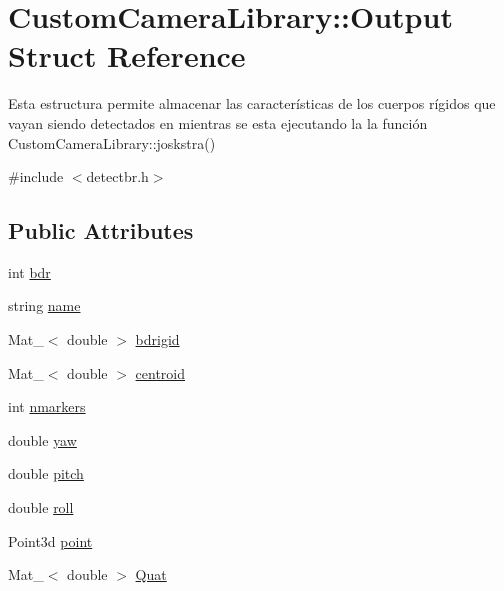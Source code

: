\hypertarget{struct_custom_camera_library_1_1_output}{}\section{Custom\+Camera\+Library\+:\+:Output Struct Reference}
\label{struct_custom_camera_library_1_1_output}


Esta estructura permite almacenar las características de los cuerpos rígidos que vayan siendo detectados en mientras se esta ejecutando la la función Custom\+Camera\+Library\+::joskstra()  




{\ttfamily \#include $<$detectbr.\+h$>$}

\subsection*{Public Attributes}
\begin{DoxyCompactItemize}
\item 
int \hyperlink{struct_custom_camera_library_1_1_output_a035a9b6775bc3cd9637f8b67018f628b}{bdr}
\item 
string \hyperlink{struct_custom_camera_library_1_1_output_af0a8276215ad6447ca0391d32ffe72f5}{name}
\item 
Mat\+\_\+$<$ double $>$ \hyperlink{struct_custom_camera_library_1_1_output_ae2017d51295ddb45390dc715b4815b29}{bdrigid}
\item 
Mat\+\_\+$<$ double $>$ \hyperlink{struct_custom_camera_library_1_1_output_a06fa54e7fbbd5075e6517b9a6c93ca97}{centroid}
\item 
int \hyperlink{struct_custom_camera_library_1_1_output_a3361db4b0b8107c1458feebbb50c0589}{nmarkers}
\item 
double \hyperlink{struct_custom_camera_library_1_1_output_a7fa444f6b387695a1b29c460fe5f1bad}{yaw}
\item 
double \hyperlink{struct_custom_camera_library_1_1_output_a2ecfe8192c7cc66e5d3385c21ef4ab39}{pitch}
\item 
double \hyperlink{struct_custom_camera_library_1_1_output_a9383b78c1f441b6c816533c0011c2478}{roll}
\item 
Point3d \hyperlink{struct_custom_camera_library_1_1_output_aa8d02d07cd889dd98ed76942616cd06c}{point}
\item 
Mat\+\_\+$<$ double $>$ \hyperlink{struct_custom_camera_library_1_1_output_a5fab2e3e26e7e4ebb82046f2c28899a7}{Quat}
\end{DoxyCompactItemize}


